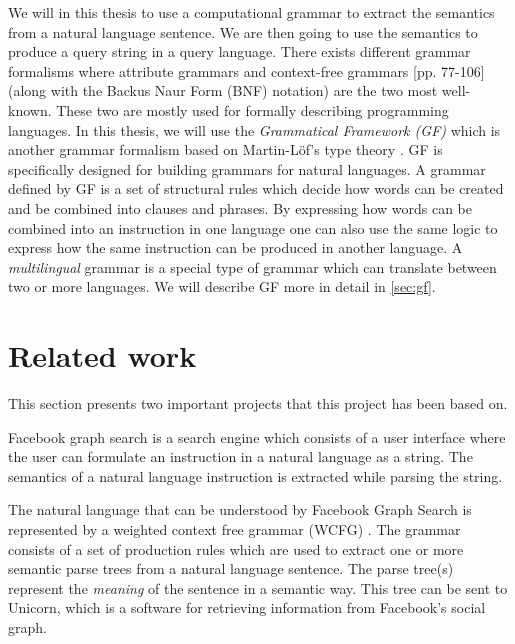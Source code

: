 We will in this thesis to use a computational grammar to extract the semantics from a natural language sentence. We are then going to use the semantics to produce a query string in a query language.
\newline
\newline
There exists different grammar formalisms where attribute grammars \cite{knuth:1968} and context-free grammars \cite{Hopcroft:1990:IAT:574901}[pp. 77-106] (along with the Backus Naur Form (BNF) \cite{Knuth:1964:BNF:355588.365140} notation) are the two most well-known. These two are mostly used for formally describing programming languages.
\newline
\newline
In this thesis, we will use the \emph{Grammatical Framework (GF)} which is another grammar formalism \cite{ranta:2004} based on Martin-Löf's type theory \cite{Martin-lof}. GF is specifically designed for building grammars for natural languages.
\newline
\newline
A grammar defined by GF is a set of structural rules which decide how words can be created and be combined into clauses and phrases. By expressing how words can be combined into an instruction in one language one can also use the same logic to express how the same instruction can be produced in another language. A \emph{multilingual} grammar is a special type of grammar which can translate between two or more languages. We will describe GF more in detail in \autoref{sec:gf}.

\section{Related work}
This section presents two important projects that this project has been based on.

Facebook graph search \cite{unicorn} is a search engine which consists of a user interface where the user can formulate an instruction in a natural language as a string. The semantics of a natural language instruction is extracted while parsing the string.

The natural language that can be understood by Facebook Graph Search is represented by a weighted context free grammar (WCFG) \cite{li:2013}. The grammar consists of a set of production rules which are used to extract one or more semantic parse trees from a natural language sentence. The parse tree(s) represent the \emph{meaning} of the sentence in a semantic way. This tree can be sent to Unicorn, which is a software for retrieving information from Facebook's social graph. \cite{unicorn}

